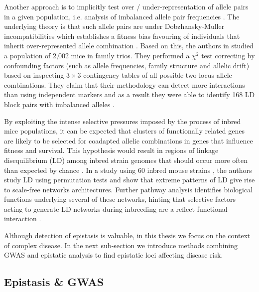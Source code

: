 Another approach is to implicitly test over / under-representation of allele pairs in a given population, i.e. analysis of imbalanced allele pair frequencies \cite{ackermann2012systematic}.
The underlying theory is that such allele pairs are under Dobzhansky-Muller incompatibilities which establishes a fitness bias favouring of individuals that inherit over-represented allele combination \cite{ackermann2012systematic}.
Based on this, the authors in \cite{ackermann2012systematic} studied a population of 2,002 mice in family trios.
They performed a $\chi^2$ test correcting by confounding factors (such as allele frequencies, family structure and allelic drift) based on inspecting $3 \times 3$ contingency tables of all possible two-locus allele combinations.
They claim that their methodology can detect more interactions than using independent markers and as a result they were able to identify 168 LD block pairs with imbalanced alleles \cite{ackermann2012systematic}.

By exploiting the  intense selective pressures imposed by the process of inbred mice populations, it can be expected that clusters of functionally related genes are likely to be selected for coadapted allelic combinations in genes that influence fitness and survival.
This hypothesis would result in regions of linkage disequilibrium (LD) among inbred strain genomes that should occur more often than expected by chance \cite{petkov2005evidence}.
In a study using 60 inbred mouse strains \cite{petkov2005evidence}, the authors study LD using permutation tests and show that extreme patterns of LD give rise to scale-free networks architectures.
Further pathway analysis identifies biological functions underlying several of these networks, hinting that selective factors acting to generate LD networks during inbreeding are a reflect functional interaction \cite{petkov2005evidence}.

Although detection of epistasis is valuable, in this thesis we focus on the context of complex disease.
In the next sub-section we introduce methods combining GWAS and epistatic analysis to find epistatic loci affecting disease risk.

\subsection{Epistasis \& GWAS}

